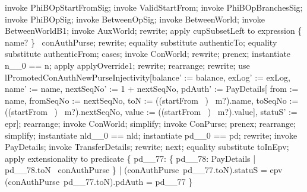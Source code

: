 \begin{LPScript}\begin{zproof}[lPromotedAuxWorldStartFromType]
    invoke PhiBOpStartFromSig;
    invoke ValidStartFrom;
    invoke PhiBOpBranchesSig;
    invoke PhiBOpSig;
    invoke BetweenOpSig;
    invoke BetweenWorld;
    invoke BetweenWorldB1;
    invoke AuxWorld;
    rewrite;
    apply cupSubsetLeft to expression \{ name? \} \cup \dom~conAuthPurse;
    rewrite;
    equality substitute authenticTo;
    equality substitute authenticFrom;
    cases;
        invoke ConWorld;
        rewrite;
        prenex;
        instantiate n\_\_0 == n;
        apply applyOverride1;
        rewrite;
        rearrange;
        rewrite;
        use lPromotedConAuthNewPurseInjectivity[balance' := balance,
            exLog' := exLog, name' := name, nextSeqNo' := 1 + nextSeqNo,
            pdAuth' := \theta PayDetails[
                from := name, fromSeqNo := nextSeqNo,
                toN := ((startFrom~ \inv)~ m?).name,
                toSeqNo := ((startFrom~ \inv)~ m?).nextSeqNo,
                value := ((startFrom~ \inv)~ m?).value],
            statuS' := epr];
        rearrange;
        invoke ConWorld;
        simplify;
        invoke ConPurse;
        prenex;
        rearrange;
        simplify;
        instantiate nld\_\_0 == nld;
        instantiate pd\_\_0 == pd;
        rewrite;
        invoke PayDetails;
        invoke TransferDetails;
        rewrite;
    next;
        equality substitute toInEpv;
        apply extensionality to predicate
            \{ pd\_\_77: \{ pd\_\_78: PayDetails | pd\_\_78.toN \in \dom~conAuthPurse \}
              | (conAuthPurse~pd\_\_77.toN).statuS = epv
             \land (conAuthPurse~pd\_\_77.toN).pdAuth = pd\_\_77 \}

\end{zproof}
\end{LPScript}
